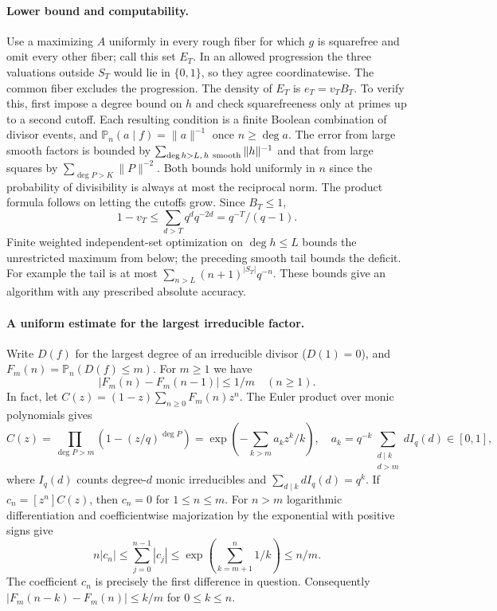 \paragraph{Lower bound and computability.}
Use a maximizing $A$ uniformly in every rough fiber for which $g$ is squarefree and omit every other fiber; call this set $E_T$. In an allowed progression the three valuations outside $S_T$ would lie in $\{0,1\}$, so they agree coordinatewise. The common fiber excludes the progression. The density of $E_T$ is $e_T=v_T B_T$. To verify this, first impose a degree bound on $h$ and check squarefreeness only at primes up to a second cutoff. Each resulting condition is a finite Boolean combination of divisor events, and $\mathbb P_n(a\mid f)=\|a\|^{-1}$ once $n\ge\deg a$. The error from large smooth factors is bounded by $\sum_{\deg h>L,\, h\ {\rm smooth}}\|h\|^{-1}$ and that from large squares by $\sum_{\deg P>K}\|P\|^{-2}$. Both bounds hold uniformly in $n$ since the probability of divisibility is always at most the reciprocal norm. The product formula follows on letting the cutoffs grow. Since $B_T\le1$,
\[
 1-v_T\le\sum_{d>T}q^d q^{-2d}=q^{-T}/(q-1).
\]
Finite weighted independent-set optimization on $\deg h\le L$ bounds the unrestricted maximum from below; the preceding smooth tail bounds the deficit. For example the tail is at most $\sum_{n>L}(n+1)^{|S_T|}q^{-n}$. These bounds give an algorithm with any prescribed absolute accuracy.

\paragraph{A uniform estimate for the largest irreducible factor.}
Write $D(f)$ for the largest degree of an irreducible divisor ($D(1)=0$), and $F_m(n)=\mathbb P_n(D(f)\le m)$. For $m\ge1$ we have
\[
 |F_m(n)-F_m(n-1)|\le 1/m\quad(n\ge1).
\]
In fact, let $C(z)=(1-z)\sum_{n\ge0}F_m(n)z^n$. The Euler product over monic polynomials gives
\[
 C(z)=\prod_{\deg P>m}(1-(z/q)^{\deg P})
     =\exp\!\left(-\sum_{k>m}a_kz^k/k\right),\quad
 a_k=q^{-k}\!\sum_{\substack{d\mid k\\d>m}} dI_q(d)\in[0,1],
\]
where $I_q(d)$ counts degree-$d$ monic irreducibles and $\sum_{d\mid k}dI_q(d)=q^k$. If $c_n=[z^n]C(z)$, then $c_n=0$ for $1\le n\le m$. For $n>m$ logarithmic differentiation and coefficientwise majorization by the exponential with positive signs give
\[
 n|c_n|\le\sum_{j=0}^{n-1}|c_j|
 \le\exp\!\left(\sum_{k=m+1}^{n}1/k\right)\le n/m .
\]
The coefficient $c_n$ is precisely the first difference in question. Consequently $|F_m(n-k)-F_m(n)|\le k/m$ for $0\le k\le n$.

